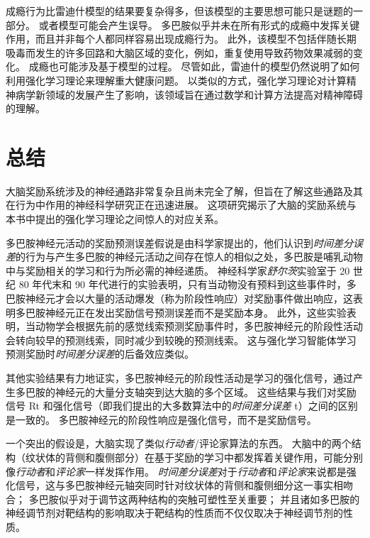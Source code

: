 成瘾行为比雷迪什模型的结果要复杂得多，但该模型的主要思想可能只是谜题的一部分。
或者模型可能会产生误导。
多巴胺似乎并未在所有形式的成瘾中发挥关键作用，而且并非每个人都同样容易出现成瘾行为。
此外，该模型不包括伴随长期吸毒而发生的许多回路和大脑区域的变化，例如，重复使用导致药物效果减弱的变化。
成瘾也可能涉及基于模型的过程。
尽管如此，雷迪什的模型仍然说明了如何利用强化学习理论来理解重大健康问题。
以类似的方式，强化学习理论对计算精神病学新领域的发展产生了影响，该领域旨在通过数学和计算方法提高对精神障碍的理解。


\section{总结}

大脑奖励系统涉及的神经通路非常复杂且尚未完全了解，但旨在了解这些通路及其在行为中作用的神经科学研究正在迅速进展。
这项研究揭示了大脑的奖励系统与本书中提出的强化学习理论之间惊人的对应关系。


多巴胺神经元活动的奖励预测误差假说是由科学家提出的，他们认识到\textit{时间差分误差}的行为与产生多巴胺的神经元活动之间存在惊人的相似之处，多巴胺是哺乳动物中与奖励相关的学习和行为所必需的神经递质。
神经科学家\textit{舒尔茨}实验室于 20 世纪 80 年代末和 90 年代进行的实验表明，只有当动物没有预料到这些事件时，多巴胺神经元才会以大量的活动爆发（称为阶段性响应）对奖励事件做出响应，这表明多巴胺神经元正在发出奖励信号预测误差而不是奖励本身。
此外，这些实验表明，当动物学会根据先前的感觉线索预测奖励事件时，多巴胺神经元的阶段性活动会转向较早的预测线索，同时减少到较晚的预测线索。
这与强化学习智能体学习预测奖励时\textit{时间差分误差}的后备效应类似。


其他实验结果有力地证实，多巴胺神经元的阶段性活动是学习的强化信号，通过产生多巴胺的神经元的大量分支轴突到达大脑的多个区域。
这些结果与我们对奖励信号 Rt 和强化信号（即我们提出的大多数算法中的\textit{时间差分误差} t）之间的区别是一致的。
多巴胺神经元的阶段性响应是强化信号，而不是奖励信号。


一个突出的假设是，大脑实现了类似\textit{行动者}/评论家算法的东西。
大脑中的两个结构（纹状体的背侧和腹侧部分）在基于奖励的学习中都发挥着关键作用，可能分别像\textit{行动者}和\textit{评论家}一样发挥作用。
\textit{时间差分误差}对于\textit{行动者}和\textit{评论家}来说都是强化信号，这与多巴胺神经元轴突同时针对纹状体的背侧和腹侧细分这一事实相吻合；
多巴胺似乎对于调节这两种结构的突触可塑性至关重要；
并且诸如多巴胺的神经调节剂对靶结构的影响取决于靶结构的性质而不仅仅取决于神经调节剂的性质。



